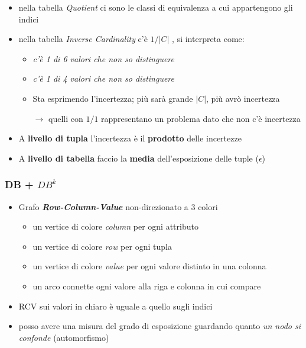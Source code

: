 \documentclass{report}
\begin{document}
\newpage
\begin{itemize}
    \item nella tabella \textit{Quotient} ci sono le classi di equivalenza a cui appartengono gli indici
    \item nella tabella \textit{Inverse Cardinality} c'è $1/|C|$ , si interpreta come:
    \begin{itemize}
        \item \textit{c'è 1 di 6 valori che non so distinguere}
        \item \textit{c'è 1 di 4 valori che non so distinguere}
        \item Sta esprimendo l'incertezza; più sarà grande $|C|$, più avrò incertezza 
        
        $\rightarrow$ quelli con $1/1$ rappresentano un problema dato che non c'è incertezza
    \end{itemize}
    \item A \textbf{livello di tupla} l'incertezza è il \textbf{prodotto} delle incertezze
    \item A \textbf{livello di tabella} faccio la \textbf{media} dell'esposizione delle tuple ($\epsilon$)
\end{itemize}

\subsubsection{DB + $DB^k$}
\begin{itemize}
    \item Grafo \textbf{\textit{Row-Column-Value}} non-direzionato a 3 colori
    \begin{itemize}
        \item un vertice di colore \textit{column} per ogni attributo 
        \item un vertice di colore \textit{row} per ogni tupla 
        \item un vertice di colore \textit{value} per ogni valore distinto in una colonna
        \item un arco connette ogni valore alla riga e colonna in cui compare
    \end{itemize}
    \item RCV sui valori in chiaro è uguale a quello sugli indici
    \item posso avere una misura del grado di esposizione guardando quanto \textit{un nodo si confonde} (automorfismo)
\end{itemize}
\end{document}

